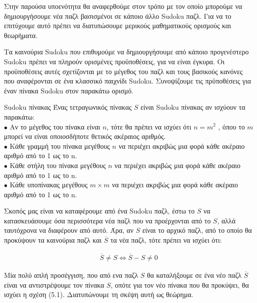 \documentclass[oneside,12pt]{book}
\theoremstyle{definition}
\begin{document}
Στην παρούσα υποενότητα θα αναφερθούμε στον τρόπο με τον οποίο μπορούμε να δημιουργήσουμε νέα παζλ βασισμένοι σε κάποιο άλλο Sudoku παζλ. Για να το επιτύχουμε αυτό πρέπει να διατυπώσουμε μερικούς μαθηματικούς ορισμούς και θεωρήματα. \par

Τα καινούρια Sudoku που επιθυμούμε να δημιουργήσουμε από κάποιο προγενέστερο Sudoku πρέπει να πληρούν ορισμένες προϋποθέσεις, για να είναι έγκυρα. Οι προϋποθέσεις αυτές σχετίζονται με το μέγεθος του παζλ και τους βασικούς κανόνες που αναφέρονται σε ένα κλασσικό παιχνίδι Sudoku. Συνοψίζουμε τις πρϋποθέσεις για έναν πίνακα Sudoku στον παρακάτω ορισμό. \par

\begin{mytheorem}{Sudoku πίνακας}{}
	Ένας τετραγωνικός πίνακας \(S\) είναι Sudoku πίνακας αν ισχύουν τα παρακάτω: \\
	\(\bullet\) Αν το μέγεθος του πίνακα είναι \(n\), τότε θα πρέπει να ισχύει ότι \(n = m^{2}\) , όπου το \(m\) μπορεί να είναι οποιοσδήποτε θετικός ακέραιος αριθμός. \\
	\(\bullet\) Κάθε γραμμή του πίνακα μεγέθους \(n\) να περιέχει ακριβώς μια φορά κάθε ακέραιο αριθμό από το 1 ως το n. \\
	\(\bullet\) Κάθε στήλη του πίνακα μεγέθους \(n\) να περιέχει ακριβώς μια φορά κάθε ακέραιο αριθμό από το 1 ως το n. \\
	\(\bullet\) Κάθε υποπίνακας μεγέθους \(m \times m\) να περιέχει ακριβώς μια φορά κάθε ακέραιο αριθμό από το 1 ως το n. \\
\end{mytheorem}

Σκοπός μας είναι να καταφέρουμε από ένα Sudoku παζλ, έστω το \(S\) να κατασκευάσουμε όσα περισσότερα νέα παζλ που να προέρχονται από το \(S\), αλλά ταυτόχρονα να διαφέρουν από αυτό. Άρα, αν \(S\) είναι το αρχικό παζλ, από το οποίο θα προκύψουν τα καινούρια παζλ και \(\overline{S}\) τα νέα παζλ, τότε πρέπει να ισχύει ότι:

\begin{align}
	\overline{S} \neq S \Leftrightarrow
	\overline{S} - S \neq 0
\end{align}

Μία πολύ απλή προσέγγιση, που από ενα παζλ \(S\) θα καταλήξουμε σε ένα νέο παζλ \(\overline{S}\) είναι να αντιστρέψουμε τον πίνακα \(S\), οπότε για τον νέο πίνακα που θα προκύψει, θα ισχύει η σχέση (5.1). Διατυπώνουμε τη σκέψη αυτή ως θεώρημα. \par
\end{document}
